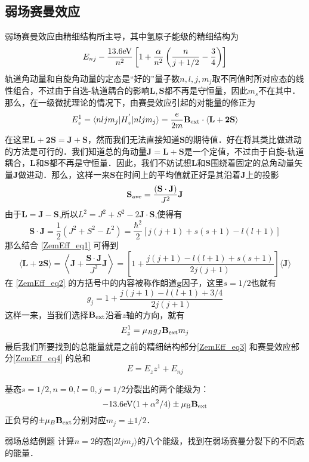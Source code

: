 \subsection{弱场赛曼效应}
弱场赛曼效应由精细结构所主导，其中氢原子能级的精细结构为
\begin{equation}\label{ZemEff_eq3}
E_{nj}-\frac{13.6\rm{eV}}{n^2}\left[1+\frac{\alpha}{n^2}\left(\frac{n}{j+1/2}-\frac{3}{4}\right)\right]
\end{equation}
轨道角动量和自旋角动量的定态是“好的”量子数$n,l,j,m_j$取不同值时所对应态的线性组合，不过由于自选-轨道耦合的影响$\mathbf{L,S}$都不再是守恒量，因此$m_s$不在其中．那么，在一级微扰理论的情况下，由赛曼效应引起的对能量的修正为
$$
E_z^{1}=\langle nljm_j|H_z^{'}|nljm_j\rangle=\frac{e}{2m}\mathbf{B}_{\rm{ext}}\cdot\langle\mathbf{L+2S}\rangle
$$
在这里$\mathbf{L+2S=J+S}$，然而我们无法直接知道$\mathbf{S}$的期待值．好在将其类比做进动的方法是可行的．我们知道总的角动量$\mathbf{J=L+S}$是一个定值，不过由于自旋-轨道耦合，$\mathbf{L}$和$\mathbf{S}$都不再是守恒量．因此，我们不妨试想$\mathbf{L}$和$\mathbf{S}$围绕着固定的总角动量矢量$\mathbf{J}$做进动．那么，这样一来$\mathbf{S}$在时间上的平均值就正好是其沿着$\mathbf{J}$上的投影
\begin{equation}\label{ZemEff_eq1}
\mathbf{S}_{\rm{ave}}=\frac{(\mathbf{S\cdot J})}{J^2}\mathbf{J}
\end{equation}
由于$\mathbf{L=J-S}$,所以$L^2=J^2+S^2-2\mathbf{J\cdot S}$,使得有
\begin{equation}
\mathbf{S\cdot J}=\frac{1}{2}(J^2+S^2-L^2)=\frac{\hbar^2}{2}[j(j+1)+s(s+1)-l(l+1)]
\end{equation}
那么结合 \autoref{ZemEff_eq1} 可得到
\begin{equation}\label{ZemEff_eq2}
\langle \mathbf{L+2S}\rangle =\left\langle \mathbf{J}+\frac{\mathbf{S\cdot J}}{J^2}\mathbf{J}\right\rangle=\left[1+\frac{j(j+1)-l(l+1)+s(s+1)}{2j(j+1)}\right]\langle\mathbf{J}\rangle
\end{equation}
在 \autoref{ZemEff_eq2} 的方括号中的内容被称作朗道$\mathbf{g}$因子，这里$s=1/2$也就有
\begin{equation}
g_j=1+\frac{j(j+1)-l(l+1)+3/4}{2j(j+1)}
\end{equation}
这样一来，当我们选择$\mathbf{B}_{\rm{ext}}$沿着$z$轴的方向，就有
\begin{equation}\label{ZemEff_eq4}
E^1_z =\mu_Bg_J\mathbf{B}_{\rm{ext}}m_j
\end{equation}
最后我们所要找到的总能量就是之前的精细结构部分\autoref{ZemEff_eq3} 和赛曼效应部分\autoref{ZemEff_eq4} 的总和
\begin{equation}
E=E_zz^1+E_{nj}
\end{equation}
\begin{example}{}
基态$s=1/2,n=0,l=0,j=1/2$分裂出的两个能级为：
\begin{equation}
-13.6\rm{eV}(1+\alpha^2/4)\pm\mu_B\mathbf{B}_{\rm{ext}}\notag
\end{equation}
正负号的$\pm\mu_B\mathbf{B}_{\rm{ext}}$分别对应$m_j=\pm1/2$．
\end{example}
\begin{example}{弱场总结例题}
计算$n=2$的态$|2ljm_j\rangle$的八个能级，找到在弱场赛曼分裂下的不同态的能量．
\end{example}
